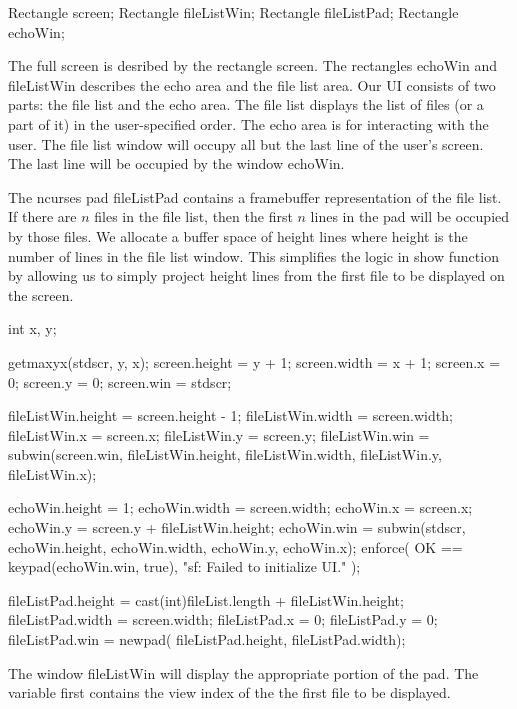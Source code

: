 Rectangle screen;
Rectangle fileListWin;
Rectangle fileListPad;
Rectangle echoWin;

\nwendcode{}The full screen is desribed by the rectangle {\Tt{}screen\nwendquote}. The
rectangles {\Tt{}echoWin\nwendquote} and {\Tt{}fileListWin\nwendquote} describes the echo area and the file list area. Our UI consists of two parts: the file list and
the echo area. The file list displays the list of files (or a part of
it) in the user-specified order. The echo area is for interacting with
the user. The file list window will occupy all but the last line of
the user's screen. The last line will be occupied by the window
{\Tt{}echoWin\nwendquote}.

The ncurses pad {\Tt{}fileListPad\nwendquote} contains a framebuffer representation
of the file list. If there are $n$ files in the file list, then the
first $n$ lines in the pad will be occupied by those files. We
allocate a buffer space of {\Tt{}height\nwendquote} lines where {\Tt{}height\nwendquote} is the
number of lines in the file list window. This simplifies the logic in
{\Tt{}show\nwendquote} function by allowing us to simply project {\Tt{}height\nwendquote} lines
from the first file to be displayed on the screen.

\nwenddocs{}\endmoddef\nwstartdeflinemarkup\nwenddeflinemarkup
int x, y;

getmaxyx(stdscr, y, x);
screen.height = y + 1;
screen.width  = x + 1;
screen.x      = 0;
screen.y      = 0;
screen.win    = stdscr;

fileListWin.height = screen.height - 1;
fileListWin.width  = screen.width;
fileListWin.x      = screen.x;
fileListWin.y      = screen.y;
fileListWin.win    = subwin(screen.win,
  fileListWin.height,
  fileListWin.width,
  fileListWin.y,
  fileListWin.x);

echoWin.height = 1;
echoWin.width  = screen.width;
echoWin.x      = screen.x;
echoWin.y      = screen.y + fileListWin.height;
echoWin.win    = subwin(stdscr,
  echoWin.height,
  echoWin.width,
  echoWin.y,
  echoWin.x);
enforce(
  OK == keypad(echoWin.win, true),
  "sf: Failed to initialize UI."
);

fileListPad.height = cast(int)fileList.length + fileListWin.height;
fileListPad.width  = screen.width;
fileListPad.x      = 0;
fileListPad.y      = 0;
fileListPad.win    = newpad(
  fileListPad.height,
  fileListPad.width);

\nwendcode{}The window {\Tt{}fileListWin\nwendquote} will display the appropriate portion of
the pad. The variable {\Tt{}first\nwendquote} contains the view index of the the
first file to be displayed.

